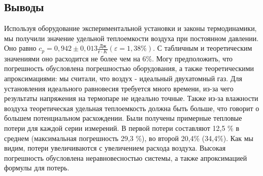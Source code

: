 \documentclass[a4paper]{article}
\begin{document}
\begin{enumerate}
\section{Выводы}
Используя оборудование экспериментальной установки и законы термодинамики, мы получили значение удельной теплоемкости воздуха при постоянном давлении. Оно равно $c_{p} = 0,942 \pm 0,013 \frac{\text{Дж}}{г\cdot K} (\varepsilon = 1,38\%)$. С табличным и теоретическим значениями оно расходится не более чем на 6\%. Могу предположить, что погрешность обусловлена погрешностью оборудования, а также теоретическими апроксимациями: мы считали, что воздух - идеальный двухатомный газ. Для установления идеального равновесия 
требуется много времени, из-за чего результаты напряжения на термопаре не идеально точные. Также из-за влажности воздуха теоретическая удельная теплоемкость должна быть больше, что говорит о большем потенциальном расхождении.
Были получены примерные тепловые потери для каждой серии измерений. В первой потери составляют 12,5 \% в среднем (максимальная погрешность 29,3 \%), во второй 20,4\% (34,4\%). Как мы видим, потери увеличиваются с увеличением расхода воздуха. Высокая погрешность обусловлена неравновесностью системы, а также апроксимацией формулы для потерь.
\end{enumerate}
\end{document}
